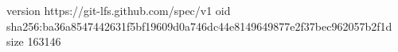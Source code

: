 version https://git-lfs.github.com/spec/v1
oid sha256:ba36a8547442631f5bf19609d0a746dc44e8149649877e2f37bec962057b2f1d
size 163146
